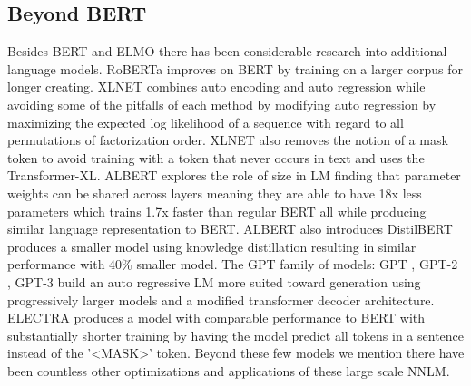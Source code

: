 \subsection{Beyond BERT}
Besides BERT and ELMO there has been considerable research into additional language models. RoBERTa \cite{Liu2019RoBERTaAR} improves on BERT by training on a larger corpus for longer creating. XLNET \cite{Yang2019XLNetGA} combines auto encoding and auto regression while avoiding some of the pitfalls of each method by modifying auto regression by maximizing the expected log likelihood of a sequence with regard to all permutations of factorization order. XLNET also removes the notion of a mask token to avoid training with a token that never occurs in text and uses the Transformer-XL. ALBERT \cite{Lan2019ALBERTAL} explores the role of size in LM finding that parameter weights can be shared across layers meaning they are able to have 18x less parameters which trains 1.7x faster than regular BERT all while producing similar language representation to BERT. ALBERT also introduces DistilBERT \cite{Sanh2019DistilBERTAD} produces a smaller model using knowledge distillation resulting in similar performance with 40\% smaller model. The GPT family of models: GPT \cite{Radford2018ImprovingLU}, GPT-2 \cite{Radford2019LanguageMA}, GPT-3 \cite{Brown2020LanguageMA} build an auto regressive LM more suited toward generation using progressively larger models and a modified transformer decoder architecture. ELECTRA \cite{Clark2020ELECTRAPT} produces a model with comparable performance to BERT with substantially shorter training by having the model predict all tokens in a sentence instead of the '<MASK>' token. Beyond these few models we mention there have been countless other optimizations and applications of these large scale NNLM. 
